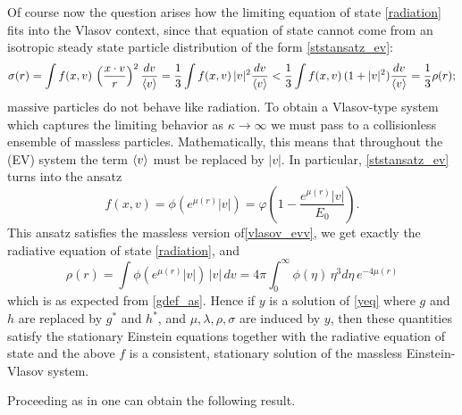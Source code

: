 \documentclass[11pt]{article}
\begin{document}
Of course now the question arises how the limiting
equation of state \eqref{radiation} fits into the Vlasov
context, since that equation of state
cannot come from an isotropic
steady state particle distribution of the form \eqref{ststansatz_ev}:
\[
\sigma (r) =
\int  f(x,v)\, \left(\frac{x\cdot v}{r}\right)^2 \frac{dv}{\left\langle v\right\rangle}
=
\frac{1}{3}\int  f(x,v)\, |v|^2 \frac{dv}{\left\langle v\right\rangle}
<
\frac{1}{3}\int  f(x,v)\, (1+|v|^2) \frac{dv}{\left\langle v\right\rangle}
= \frac{1}{3} \rho(r);
\]
massive particles do not behave like radiation.
To obtain a Vlasov-type system which captures the
limiting behavior as $\kappa \to \infty$ we must
pass to a collisionless ensemble of massless particles.
Mathematically, this means that throughout the (EV) system
the term $\left\langle v\right\rangle$ must be replaced by $|v|$. In particular,
\eqref{ststansatz_ev} turns into the ansatz
\[
f(x,v) = \phi(e^{\mu(r)}|v|) = \varphi\left(1-\frac{e^{\mu(r)}|v|}{E_0}\right).
\]
This ansatz satisfies the massless version of\eqref{vlasov_evv},
we get exactly the radiative equation of state 
\eqref{radiation}, and
\[
\rho(r) = \int \phi(e^{\mu(r)}|v|)\, |v|\, dv
= 4\pi \int_0^\infty \phi(\eta)\, \eta^3 d\eta \, e^{-4\mu(r)}
\]
which is as expected from \eqref{gdef_as}.
Hence if $y$ is a solution 
of \eqref{yeq} where $g$ and $h$ are replaced by
$g^\ast$ and $h^\ast$, and
$\mu, \lambda, \rho, \sigma$ are induced by $y$,
then these quantities satisfy
the stationary Einstein equations together with the radiative equation of state
and the above $f$ is a consistent, stationary solution of the
massless Einstein-Vlasov system.

Proceeding as in \cite[Theorem~3.4]{Rein94} one can obtain the following result.

\end{document}
